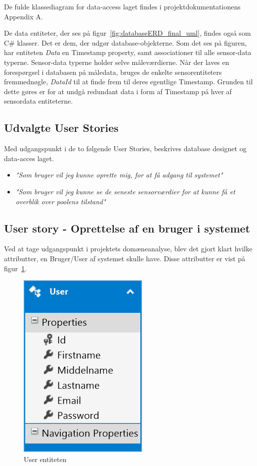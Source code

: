 De fulde klassediagram for data-access laget findes i projektdokumentationens Appendix A.

De data entiteter, der ses på figur~\ref{fig:databaseERD_final_uml}, findes også som C\# klasser. Det er dem, der udgør database-objekterne. Som det ses på figuren, har entiteten \textit{Data} en Timestamp property, samt associationer til alle sensor-data typerne. Sensor-data typerne holder selve måleværdierne. Når der laves en forespørgsel i databasen på måledata, bruges de enkelte sensorentiteters fremmednøgle, \textit{DataId} til at finde frem til deres egentlige Timestamp. Grunden til dette gøres er for at undgå redundant data i form af Timestamp på hver af sensordata entiteterne.

\subsection{Udvalgte User Stories}
Med udgangspunkt i de to følgende User Stories, beskrives database designet og data-acces laget. 

\begin{itemize}
	\item \textit{"Som bruger vil jeg kunne oprette mig, for at få adgang til systemet"}
	\item \textit{"Som bruger vil jeg kunne se de seneste sensorværdier for at kunne få et overblik over poolens tilstand"}
\end{itemize}

\subsection{User story - Oprettelse af en bruger i systemet}

Ved at tage udgangspunkt i projektets domæneanalyse, blev det gjort klart hvilke attributter, en Bruger/User af systemet skulle have. Disse attributter er vist på figur~\ref{fig:database_model_1}.

\begin{figure}[h]
\centering
\includegraphics[width=0.2\linewidth]{figs/database/database_model_1.png}
\caption{User entiteten}
\label{fig:database_model_1}
\end{figure}

